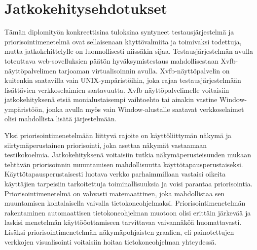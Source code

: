 \section{Jatkokehitysehdotukset} \label{ch:12_jatkokehitysehdotukset}

  Tämän diplomityön konkreettisina tuloksina syntyneet testausjärjestelmä ja priorisointimenetelmä ovat sellaisenaan käyttövalmiita ja toimivaksi todettuja, mutta jatkokehittelylle on luonnollisesti niissäkin sijaa.
  Testausjärjestelmän avulla toteuttava web-sovelluksien päätön hyväksymistestaus mahdollisestaan Xvfb-näyttöpalvelimen tarjoaman virtualisoinnin avulla.
  Xvfb-näyttöpalvelin on kuitenkin saatavilla vain UNIX-ympäristöihin, joka rajaa testausjärjestelmään lisättävien verkkoselaimien saatavuutta.
  Xvfb-näyttöpalvelimelle voitaisiin jatkokehityksenä etsiä monialustaisempi vaihtoehto tai ainakin vastine Window-ympäristöön, jonka avulla myös vain Window-alustalle saatavat verkkoselaimet olisi mahdollista lisätä järjestelmään.

  Yksi priorisointimenetelmään liittyvä rajoite on käyttöliittymän näkymä ja siirtymäperustainen priorisointi, joka asettaa näkymät vastaamaan testikokoelmia.
  Jatkokehityksenä voitaisiin tutkia näkymäperusteisuuden mukaan tehtävän priorisoinnin muuntamisen mahdollisuutta käyttötapausperustaiseksi.
  Käyttötapausperustaisesti luotava verkko parhaimmillaan vastaisi oikeita käyttäjien tarpeisiin tarkoitettuja toiminallisuuksia ja voisi parantaa priorisointia.
  Priorisointimenetelmä on vahvasti matemaattinen, joka mahdollistaa sen muuntamisen kohtalaisella vaivalla tietokoneohjelmaksi.
  Priorisointimenetelmän rakentaminen automaattisen tietokoneohjelman muotoon olisi erittäin järkevää ja laskisi menetelmän käyttööottamiseen tarvittavaa vaivannäköä huomattavasti.
  Lisäksi priorisointimenetelmän näkymäpohjaisten graafien, eli painotettujen verkkojen visualisointi voitaisiin hoitaa tietokoneohjelman yhteydessä.
